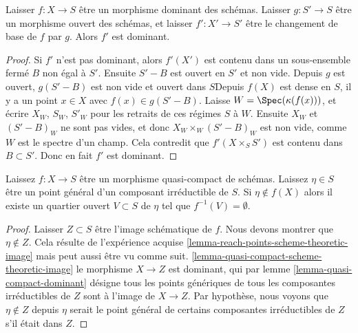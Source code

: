 \begin{lemma}

\label{lemma-open-base-change-dominant}
Laisser $f : X \to S$ être un morphisme dominant des schémas. Laisser $g : S' \to S$ être un morphisme ouvert des schémas, et laisser $f' : X' \to S'$ être le changement de base de $f$ par $g$. Alors $f'$ est dominant.
\end{lemma}

\begin{proof}

Si $f'$ n'est pas dominant, alors $f'(X')$ est contenu dans un sous-ensemble fermé $B$ non égal à $S'$. Ensuite $S'-B$ est ouvert en $S'$ et non vide. Depuis $g$ est ouvert, $g(S'-B)$ est non vide et ouvert dans $S$Depuis $f(X)$
est dense en $S$, il y a un point $x\in X$ avec $f(x) \in g(S'-B)$. Laisse $W = \Spec(\kappa (f(x)))$, et écrire $X_W$, $S_W$, $S'_W$ pour les retraits de ces régimes $S$ à $W$. Ensuite $X_W$ et $(S'-B)_W$ ne sont pas vides, et donc $X_W \times_W (S'-B)_W$ est non vide, comme $W$ est le spectre d'un champ. Cela contredit que $f'(X \times_S S')$ est contenu dans $B \subset S'$. Donc en fait $f'$ est dominant.

\end{proof}

\begin{lemma}

\label{lemma-quasi-compact-generic-point-not-in-image}
Laissez $f : X \to S$ être un morphisme quasi-compact de schémas. Laissez $\eta \in S$ être un point général d'un composant irréductible de $S$. Si $\eta \not \in f(X)$ alors il existe un quartier ouvert $V \subset S$ de $\eta$ tel que $f^{-1}(V) = \emptyset$.
\end{lemma}

\begin{proof}

Laisser $Z \subset S$ être l'image schématique de $f$. Nous devons montrer que $\eta \not \in Z$. Cela résulte de l'expérience acquise \ref{lemma-reach-points-scheme-theoretic-image}
mais peut aussi être vu comme suit. \ref{lemma-quasi-compact-scheme-theoretic-image}
le morphisme $X \to Z$ est dominant, qui par lemme \ref{lemma-quasi-compact-dominant}
désigne tous les points génériques de tous les composantes irréductibles de $Z$
sont à l'image de $X \to Z$. Par hypothèse, nous voyons que
$\eta \not \in Z$ depuis $\eta$ serait le point général de certains composantes irréductibles de $Z$ s'il était dans $Z$.

\end{proof}

